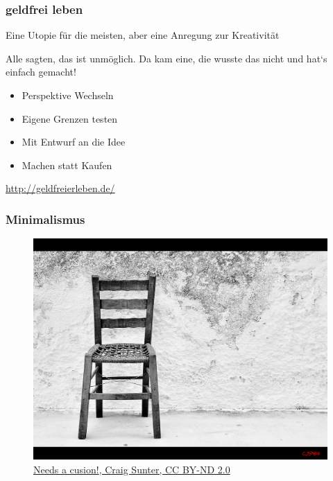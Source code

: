 \begin{frame}
	\frametitle{geldfrei leben}
Eine Utopie für die meisten, aber eine Anregung zur Kreativität

{Alle sagten, das ist unmöglich. Da kam eine, die wusste das nicht und hat‘s einfach gemacht!}

	\begin{itemize}
		\item<1-> Perspektive Wechseln
		\item<2-> Eigene Grenzen testen
		\item<3-> Mit Entwurf an die Idee
		\item<4-> Machen statt Kaufen
	\end{itemize}
	\begin{center}
		\url{http://geldfreierleben.de/}
	\end{center}
\end{frame}

\begin{frame}
	\frametitle{Minimalismus}

	\begin{figure}
		\includegraphics[height=0.7\textheight]{../../img/icecoldminimalism.jpg}
		\caption[Needs a cusion! by Craig Sunter]{\href{https://flic.kr/p/nT2jEf}{{Needs a cusion!}, Craig Sunter, CC BY-ND 2.0}}
	\end{figure}
\end{frame}

